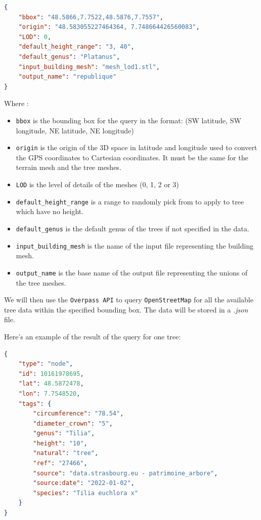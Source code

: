 \documentclass[12pt]{article}
\begin{document}
\begin{lstlisting}[language=json]
{
    "bbox": "48.5866,7.7522,48.5876,7.7557",
    "origin": "48.583055227464364, 7.748664426560083",
    "LOD": 0,
    "default_height_range": "3, 40",
    "default_genus": "Platanus",
    "input_building_mesh": "mesh_lod1.stl",
    "output_name": "republique"
}
\end{lstlisting}

Where :
\begin{itemize}
    \item \texttt{bbox} is the bounding box for the query in the format:
    \subitem (SW latitude, SW longitude, NE latitude, NE longitude)
    \item \texttt{origin} is the origin of the 3D space in latitude and longitude
    used to convert the GPS coordinates to Cartesian coordinates. It must be the
    same for the terrain mesh and the tree meshes.
    \item \texttt{LOD} is the level of details of the meshes (0, 1, 2 or 3)
    \item \texttt{default\_height\_range} is a range to randomly pick from to apply to tree which have no height.
    \item \texttt{default\_genus} is the default genus of the trees if not specified in the data.
    \item \texttt{input\_building\_mesh} is the name of the input file representing the building mesh.
    \item \texttt{output\_name} is the base name of the output file representing the unions of the tree meshes.
\end{itemize}


We will then use the \texttt{Overpass API} to query \texttt{OpenStreetMap}
for all the available tree data within the specified bounding box.
The data will be stored in a \textit{.json} file.

\newpage
Here's an example of the result of the query for one tree:

\begin{lstlisting}[language=json]
{
    "type": "node",
    "id": 10161978695,
    "lat": 48.5872478,
    "lon": 7.7548520,
    "tags": {
        "circumference": "78.54",
        "diameter_crown": "5",
        "genus": "Tilia",
        "height": "10",
        "natural": "tree",
        "ref": "27466",
        "source": "data.strasbourg.eu - patrimoine_arbore",
        "source:date": "2022-01-02",
        "species": "Tilia euchlora x"
    }
}
\end{lstlisting}
\end{document}

